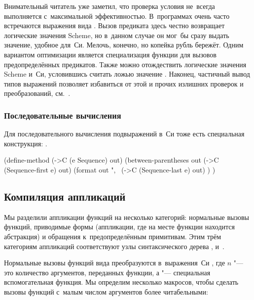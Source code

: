 Внимательный читатель уже заметил, что проверка условия не~всегда выполняется
с~максимальной эффективностью. В~программах очень часто встречаются выражения
вида . Вызов предиката  здесь честно возвращает
логические значения Scheme, но в~данном случае он мог~бы сразу выдать значение,
удобное для~Си. Мелочь, конечно, но копейка рубль бережёт. Одним вариантом
оптимизации является специализация функции  для вызовов
предопределённых предикатов. Также можно отождествить логические значения Scheme
и~Си, условившись считать ложью значение . Наконец, частичный вывод
типов выражений позволяет избавиться от этой и прочих излишних проверок и
преобразований, см.~\cite{shi91,ser93,wc94}.


\subsubsection{Последовательные вычисления}\label{cc/gen/exprs/sssect:sequences}

Для последовательного вычисления подвыражений в~Си тоже есть специальная
конструкция: .

\begin{code:lisp}
(define-method (->C (e Sequence) out)
  (between-parentheses out
    (->C (Sequence-first e) out)
    (format out ",~%
    (->C (Sequence-last e) out) ) )
\end{code:lisp}


\subsection{Компиляция аппликаций}\label{cc/gen/ssect:apply}

Мы разделили аппликации функций на несколько категорий: нормальные вызовы
функций, приводимые формы (аппликации, где на месте функции находится
абстракция) и обращения к~предопределённым примитивам. Этим трём категориям
аппликаций соответствуют узлы синтаксического дерева ,
 и~.

Нормальные вызовы функций вида  преобразуются
в~выражения~Си , где $n$ "--- это
количество аргументов, переданных функции, а  "--- специальная
вспомогательная функция. Мы определим несколько макросов, чтобы сделать вызовы
функций с~малым числом аргументов более читабельными:

